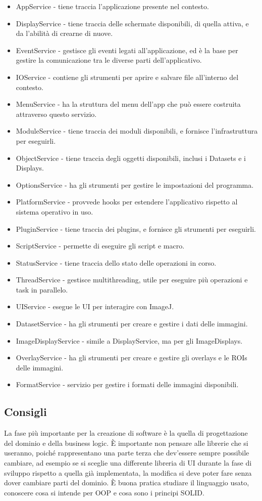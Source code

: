 \begin{itemize}
    \item AppService - tiene traccia l'applicazione presente nel contesto.
    \item DisplayService - tiene traccia delle schermate disponibili, di quella attiva, e da l'abilità di crearne di nuove.
    \item EventService - gestisce gli eventi legati all'applicazione, ed è la base per gestire la comunicazione tra le diverse parti dell'applicativo.
    \item IOService - contiene gli strumenti per aprire e salvare file all'interno del contesto.
    \item MenuService - ha la struttura del menu dell'app che può essere costruita attraverso questo servizio.
    \item ModuleService - tiene traccia dei moduli disponibili, e fornisce l'infrastruttura per eseguirli.
    \item ObjectService - tiene traccia degli oggetti disponibili, inclusi i Datasets e i Displays.
    \item OptionsService - ha gli strumenti per gestire le impostazioni del programma.
    \item PlatformService - provvede hooks per estendere l'applicativo rispetto al sistema operativo in uso.
    \item PluginService - tiene traccia dei plugins, e fornisce gli strumenti per eseguirli.
    \item ScriptService - permette di eseguire gli script e macro.
    \item StatusService - tiene traccia dello stato delle operazioni in corso.
    \item ThreadService - gestisce multithreading, utile per eseguire più operazioni e task in parallelo.
    \item UIService - esegue le UI per interagire con ImageJ.
    \item DatasetService - ha gli strumenti per creare e gestire i dati delle immagini.
    \item ImageDisplayService - simile a DisplayService, ma per gli ImageDisplays.
    \item OverlayService - ha gli strumenti per creare e gestire gli overlays e le ROIs delle immagini.
    \item FormatService - servizio per gestire i formati delle immagini disponibili.
\end{itemize}
    


\subsection{Consigli}
\noindent La fase più importante per la creazione di software è la quella di progettazione del dominio e della business logic. È importante non pensare alle librerie che si useranno, poiché rappresentano una parte terza che dev'essere sempre possibile cambiare, ad esempio se si sceglie una differente libreria di UI durante la fase di sviluppo rispetto a quella già implementata, la modifica si deve poter fare senza dover cambiare parti del dominio. È buona pratica studiare il linguaggio usato, conoscere cosa si intende per OOP e cosa sono i principi SOLID.